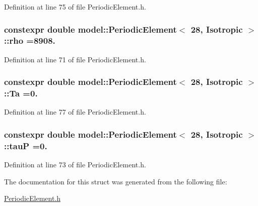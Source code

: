 Definition at line 75 of file Periodic\+Element.\+h.

\hypertarget{structmodel_1_1_periodic_element_3_0128_00_01_isotropic_01_4_a67bf117acc478f1dba6711457b360782}{}
\subsubsection[{rho}]{\setlength{\rightskip}{0pt plus 5cm}constexpr double {\bf model\+::\+Periodic\+Element}$<$ 28, {\bf Isotropic} $>$\+::rho =8908.\hspace{0.3cm}{\ttfamily [static]}}\label{structmodel_1_1_periodic_element_3_0128_00_01_isotropic_01_4_a67bf117acc478f1dba6711457b360782}


Definition at line 71 of file Periodic\+Element.\+h.

\hypertarget{structmodel_1_1_periodic_element_3_0128_00_01_isotropic_01_4_aa44bc4e6fbb8042a2460d5c4753461c7}{}
\subsubsection[{Ta}]{\setlength{\rightskip}{0pt plus 5cm}constexpr double {\bf model\+::\+Periodic\+Element}$<$ 28, {\bf Isotropic} $>$\+::Ta =0.\hspace{0.3cm}{\ttfamily [static]}}\label{structmodel_1_1_periodic_element_3_0128_00_01_isotropic_01_4_aa44bc4e6fbb8042a2460d5c4753461c7}


Definition at line 77 of file Periodic\+Element.\+h.

\hypertarget{structmodel_1_1_periodic_element_3_0128_00_01_isotropic_01_4_a6ad4c135405335fa7c154c83b78aee82}{}
\subsubsection[{tau\+P}]{\setlength{\rightskip}{0pt plus 5cm}constexpr double {\bf model\+::\+Periodic\+Element}$<$ 28, {\bf Isotropic} $>$\+::tau\+P =0.\hspace{0.3cm}{\ttfamily [static]}}\label{structmodel_1_1_periodic_element_3_0128_00_01_isotropic_01_4_a6ad4c135405335fa7c154c83b78aee82}


Definition at line 73 of file Periodic\+Element.\+h.



The documentation for this struct was generated from the following file\+:\begin{DoxyCompactItemize}
\item 
\hyperlink{_periodic_element_8h}{Periodic\+Element.\+h}\end{DoxyCompactItemize}
